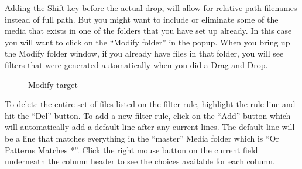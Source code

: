 Adding the Shift key before the actual drop, will allow for relative path filenames instead of full path.
But you might want to include or eliminate some of the media that exists in one of the folders that you have set up already.  
In this case you will want to click on the “Modify folder” in the popup.  
When you bring up the Modify folder window, if you already have files in that folder, you will see filters that were generated automatically when you did a Drag and Drop.


\begin{figure}[htpb]
    \centering
    
    \caption{Modify target}
    \label{fig:insertion-points}
\end{figure}

To delete the entire set of files listed on the filter rule, highlight the rule line and hit the “Del” button.  
To add a new filter rule, click on the “Add” button which will automatically add a default line after any current lines.  
The default line will be a line that matches everything in the “master” Media folder which is “Or  Patterns  Matches   *”.  
Click the right mouse button on the current field underneath the column header to see the choices available for each column.  

